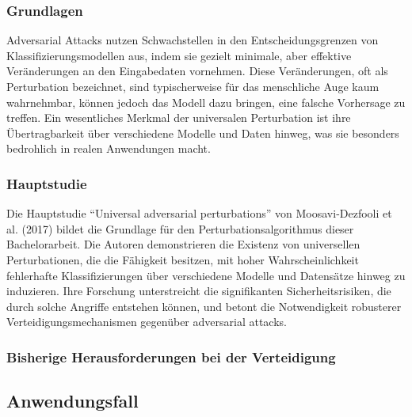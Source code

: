 \subsubsection{Grundlagen}

Adversarial Attacks nutzen Schwachstellen in den Entscheidungsgrenzen von Klassifizierungsmodellen aus, indem sie gezielt minimale, aber effektive Veränderungen an den Eingabedaten vornehmen. Diese Veränderungen, oft als Perturbation bezeichnet, sind typischerweise für das menschliche Auge kaum wahrnehmbar, können jedoch das Modell dazu bringen, eine falsche Vorhersage zu treffen. Ein wesentliches Merkmal der universalen Perturbation ist ihre Übertragbarkeit über verschiedene Modelle und Daten hinweg, was sie besonders bedrohlich in realen Anwendungen macht.

\subsubsection{Hauptstudie}

Die Hauptstudie ``Universal adversarial perturbations'' von Moosavi-Dezfooli et al. (2017) \cite{moosavi-dezfooli_universal_2017} bildet die Grundlage für den Perturbationsalgorithmus dieser Bachelorarbeit. Die Autoren demonstrieren die Existenz von universellen Perturbationen, die die Fähigkeit besitzen, mit hoher Wahrscheinlichkeit fehlerhafte Klassifizierungen über verschiedene Modelle und Datensätze hinweg zu induzieren. Ihre Forschung unterstreicht die signifikanten Sicherheitsrisiken, die durch solche Angriffe entstehen können, und betont die Notwendigkeit robusterer Verteidigungsmechanismen gegenüber adversarial attacks.

\subsubsection{Bisherige Herausforderungen bei der Verteidigung}


\subsection{Anwendungsfall}

